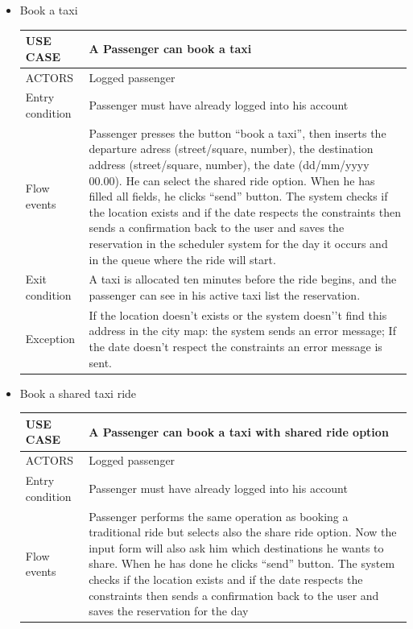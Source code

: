 \begin{itemize}
\item Book a taxi
	\begin{center}
   	 \begin{tabular}{ | l | p{11cm} |}
   	 \hline
   	USE CASE & A Passenger can book a taxi \\ \hline
   	 ACTORS & Logged passenger \\ \hline
    	 Entry condition & Passenger must have already logged into his account\\ \hline
    	 Flow events & Passenger presses the button “book a taxi”, then inserts the departure adress (street/square, number), 
    	 the destination address (street/square, number), the date (dd/mm/yyyy 00.00). He can select the shared ride option. 
    	 When he has filled all fields, he clicks “send” button. The system checks if the location exists and if the date respects 
    	 the constraints then sends a confirmation back to the user and saves the reservation in the scheduler system for the day it 
    	 occurs and in the queue where the ride will start.\\ \hline
  	   Exit condition & A taxi is allocated ten minutes before the ride begins, and the passenger can see in his active taxi list the reservation.\\ \hline
  	   Exception &  If the location doesn’t exists or the system doesn’’t find this address in the city map: the system sends an error message;
If the date doesn’t respect the constraints an error message is sent.\\ \hline
    \end{tabular}
\end{center}
\item Book a shared taxi ride
	\begin{center}
   	 \begin{tabular}{ | l | p{11cm} |}
   	 \hline
   	USE CASE & A Passenger can book a taxi with shared ride option\\ \hline
   	 ACTORS & Logged passenger \\ \hline
    	 Entry condition & Passenger must have already logged into his account \\ \hline
    	 Flow events & Passenger performs the same operation as booking a traditional 
    	 ride but selects also the share ride option. Now the input form will also ask him
    	 which destinations he wants to share. When he has done he clicks “send” button. 
    	 The system checks if the location exists and if the date respects the constraints 
    	 then sends a confirmation back to the user and saves the reservation for the day 

\end{tabular}
\end{center}
\end{itemize}

